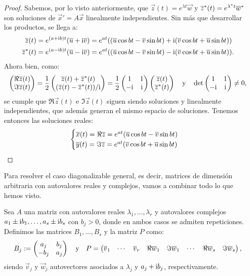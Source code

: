 \documentclass[../ecuaciones_diferenciales.tex]{subfiles}
\begin{document}
\begin{proof}
	Sabemos, por lo visto anteriormente, que 
	\(\vec{z}(t) = e^{\lambda t} \vec{w}\) y
	\({\overline{z}}^\ast(t) = e^{{\lambda}^\ast t} {\overline{w}}^\ast\)
	son soluciones de \(\vec{x}' = A\vec{x}\) 
	linealmente independientes. Sin más que desarrollar los productos, se
	llega a:
	\begin{align*}
		\overline{z}(t) &= e^{(a + \mathrm{i} b)t} (\overline{u} + \mathrm{i}\overline{v}) 
		= e^{at} ((\overline{u}\cos bt - \overline{v}\sin bt) 
		+ \mathrm{i}(\overline{v}\cos bt +\overline{u}\sin bt)) \\
		{\overline{z}}^\ast(t) &= e^{(a - \mathrm{i} b)t} (\overline{u} - \mathrm{i}\overline{v}) 
		= e^{at} ((\overline{u}\cos bt - \overline{v}\sin bt) 
		- \mathrm{i}(\overline{v}\cos bt + \overline{u}\sin bt)).
	\end{align*}
	Ahora bien, como:
	\[\begin{pmatrix}\Re \overline{z}(t) \\ \Im \overline{z}(t)\end{pmatrix} 
		= \frac{1}{2} \begin{pmatrix}\overline{z}(t) + {\overline{z}}^\ast(t) \\
			(\overline{z}(t) - {\overline{z}}^\ast(t))/\mathrm{i}\end{pmatrix} 
		= \frac{1}{2}\begin{pmatrix}1 & 1 \\ -\mathrm{i} & \mathrm{i}\end{pmatrix} 
		\begin{pmatrix}\overline{z}(t) \\ {\overline{z}}^\ast(t)\end{pmatrix} 
		\quad \text{y} \quad 
		\det\begin{pmatrix}1 & 1 \\ -\mathrm{i} & \mathrm{i}\end{pmatrix} \neq 0,\]
	se cumple que \(\Re \vec{z}(t)\) e \(\Im \vec{z}(t)\) siguen siendo 
	soluciones y linealmente independientes, que además generan el mismo 
	espacio de soluciones. Tenemos entonces las soluciones reales:
	\[\begin{cases}
		\overline{x}(t) = \Re\overline{z} = e^{at}(\overline{u}\cos bt - \overline{v}\sin bt) \\
		\overline{y}(t) = \Im\overline{z} = e^{at}(\overline{v}\cos bt + \overline{u}\sin bt)\end{cases}\]
\end{proof}

Para resolver el caso diagonalizable general, es decir, matrices de dimensión
arbitraria con autovalores reales y complejos, vamos a combinar todo lo que 
hemos visto. 

Sea \(A\) una matriz con autovalores reales \(\lambda_1, \dots, \lambda_r\)
y autovalores complejos \(a_1 \pm \mathrm{i} b_1, \dots, a_s \pm \mathrm{i} b_s\) con 
\(b_j > 0\), donde en ambos casos se admiten repeticiones. 
Definimos las matrices \(B_1, \dots, B_s\) y la matriz \(P\) como:
\[B_j := \begin{pmatrix}a_j & b_j \\ -b_j & a_j\end{pmatrix} 
	\quad \text{y} \quad
	P = \begin{pmatrix}\overline{v}_1 & \cdots & \overline{v}_r 
		& \Re \overline{w}_1 & \Im \overline{w}_1 & 
		\cdots & \Re \overline{w}_s & \Im \overline{w}_s\end{pmatrix},\]
siendo \(\vec{v}_j\) y \(\vec{w}_j\) autovectores asociados a \(\lambda_j\) 
y \(a_j + \mathrm{i} b_j\), respectivamente.
\end{document}
